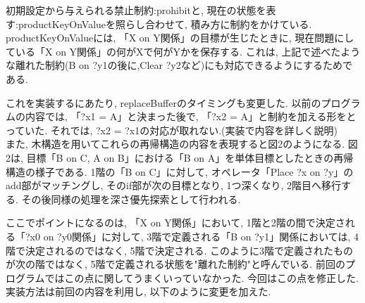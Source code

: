 \documentclass[12pt]{jarticle}
\begin{document}
初期設定から与えられる禁止制約:prohibitと, 現在の状態を表す:productKeyOnValueを照らし合わせて, 積み方に制約をかけている. productKeyOnValueには, 「X on Y関係」の目標が生じたときに, 現在問題にしている「X on Y関係」の何がXで何がYかを保存する. これは, 上記で述べたような離れた制約(B on ?y1の後に,Clear ?y2など)にも対応できるようにするためである.

これを実装するにあたり, replaceBufferのタイミングも変更した. 以前のプログラムの内容では, 「?x1 = A」と決まった後で, 「?x2 = A」と制約を加える形をとっていた. それでは, ?x2 = ?x1の対応が取れない.(実装で内容を詳しく説明)\\ %

また, 木構造を用いてこれらの再帰構造の内容を表現すると図2のようになる.
図2は, 目標「B on C, A on B」における「B on A」を単体目標としたときの再帰構造の様子である. 1階の「B on C」に対して, オペレータ「Place ?x on ?y」のadd部がマッチングし, そのif部が次の目標となり, 1つ深くなり, 2階目へ移行する. その後同様の処理を深さ優先探索として行われる.

ここでポイントになるのは, 「X on Y関係」において, 1階と2階の間で決定される「?x0 on ?y0関係」に対して, 3階で定義される「B on ?y1」関係においては, 4階で決定されるのではなく, 5階で決定される. このように3階で定義されたものが次の階ではなく, 5階で定義される状態を"離れた制約"と呼んでいる. 前回のプログラムではこの点に関してうまくいっていなかった. 今回はこの点を修正した. 実装方法は前回の内容を利用し, 以下のように変更を加えた.

\end{document}
